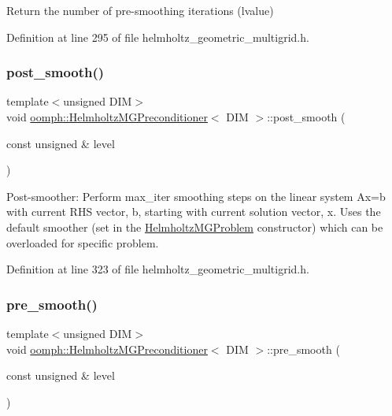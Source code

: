 Return the number of pre-\/smoothing iterations (lvalue) 



Definition at line 295 of file helmholtz\+\_\+geometric\+\_\+multigrid.\+h.

\mbox{\label{classoomph_1_1HelmholtzMGPreconditioner_a7512c2c6c3dec57da2a2e4d7422f5bd1}} 
\subsubsection{\texorpdfstring{post\+\_\+smooth()}{post\_smooth()}}
{\footnotesize\ttfamily template$<$unsigned D\+IM$>$ \\
void \hyperlink{classoomph_1_1HelmholtzMGPreconditioner}{oomph\+::\+Helmholtz\+M\+G\+Preconditioner}$<$ D\+IM $>$\+::post\+\_\+smooth (\begin{DoxyParamCaption}\item[{const unsigned \&}]{level }\end{DoxyParamCaption})\hspace{0.3cm}{\ttfamily [inline]}}



Post-\/smoother\+: Perform max\+\_\+iter smoothing steps on the linear system Ax=b with current R\+HS vector, b, starting with current solution vector, x. Uses the default smoother (set in the \hyperlink{classoomph_1_1HelmholtzMGProblem}{Helmholtz\+M\+G\+Problem} constructor) which can be overloaded for specific problem. 



Definition at line 323 of file helmholtz\+\_\+geometric\+\_\+multigrid.\+h.

\mbox{\label{classoomph_1_1HelmholtzMGPreconditioner_a045e772c0854d1410696a33f0459eec8}} 
\subsubsection{\texorpdfstring{pre\+\_\+smooth()}{pre\_smooth()}}
{\footnotesize\ttfamily template$<$unsigned D\+IM$>$ \\
void \hyperlink{classoomph_1_1HelmholtzMGPreconditioner}{oomph\+::\+Helmholtz\+M\+G\+Preconditioner}$<$ D\+IM $>$\+::pre\+\_\+smooth (\begin{DoxyParamCaption}\item[{const unsigned \&}]{level }\end{DoxyParamCaption})\hspace{0.3cm}{\ttfamily [inline]}}



